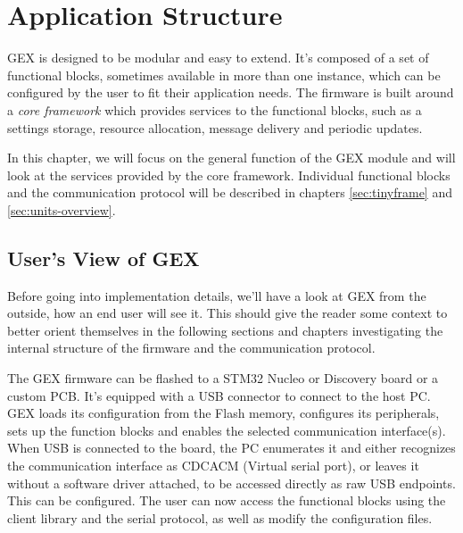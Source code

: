 \chapter{Application Structure}

GEX is designed to be modular and easy to extend. It's composed of a set of functional blocks, sometimes available in more than one instance, which can be configured by the user to fit their application needs. The firmware is built around a \textit{core framework} which provides services to the functional blocks, such as a settings storage, resource allocation, message delivery and periodic updates.

In this chapter, we will focus on the general function of the GEX module and will look at the services provided by the core framework. Individual functional blocks and the communication protocol will be described in chapters \ref{sec:tinyframe} and \ref{sec:units-overview}.

\section{User's View of GEX} 

Before going into implementation details, we'll have a look at GEX from the outside, how an end user will see it. This should give the reader some context to better orient themselves in the following sections and chapters investigating the internal structure of the firmware and the communication protocol.

The GEX firmware can be flashed to a STM32 Nucleo or Discovery board or a custom \gls{PCB}. It's equipped with a \gls{USB} connector to connect to the host \gls{PC}. GEX loads its configuration from the Flash memory, configures its peripherals, sets up the function blocks and enables the selected communication interface(s). When \gls{USB} is connected to the board, the \gls{PC} enumerates it and either recognizes the communication interface as \gls{CDCACM} (Virtual serial port), or leaves it without a software driver attached, to be accessed directly as raw \gls{USB} endpoints. This can be configured. The user can now access the functional blocks using the client library and the serial protocol, as well as modify the configuration files.

